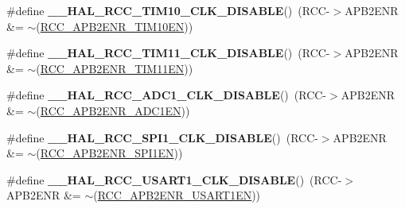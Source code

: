 \begin{DoxyCompactItemize}
\item 
\hypertarget{group___r_c_c___a_p_b2___clock___enable___disable_ga33f3e5d6b2c337d84ae550b701e37455}{\#define {\bfseries \-\_\-\-\_\-\-H\-A\-L\-\_\-\-R\-C\-C\-\_\-\-T\-I\-M10\-\_\-\-C\-L\-K\-\_\-\-D\-I\-S\-A\-B\-L\-E}()~(R\-C\-C-\/$>$A\-P\-B2\-E\-N\-R \&= $\sim$(\hyperlink{group___peripheral___registers___bits___definition_gaa98e28e157787e24b93af95273ab3055}{R\-C\-C\-\_\-\-A\-P\-B2\-E\-N\-R\-\_\-\-T\-I\-M10\-E\-N}))}\label{group___r_c_c___a_p_b2___clock___enable___disable_ga33f3e5d6b2c337d84ae550b701e37455}

\item 
\hypertarget{group___r_c_c___a_p_b2___clock___enable___disable_ga2ea675ace35a7a536c9f4cec522f28bc}{\#define {\bfseries \-\_\-\-\_\-\-H\-A\-L\-\_\-\-R\-C\-C\-\_\-\-T\-I\-M11\-\_\-\-C\-L\-K\-\_\-\-D\-I\-S\-A\-B\-L\-E}()~(R\-C\-C-\/$>$A\-P\-B2\-E\-N\-R \&= $\sim$(\hyperlink{group___peripheral___registers___bits___definition_gab1d2aeebc8ccf4e2ee18f4d924a35188}{R\-C\-C\-\_\-\-A\-P\-B2\-E\-N\-R\-\_\-\-T\-I\-M11\-E\-N}))}\label{group___r_c_c___a_p_b2___clock___enable___disable_ga2ea675ace35a7a536c9f4cec522f28bc}

\item 
\hypertarget{group___r_c_c___a_p_b2___clock___enable___disable_ga80a9e4852bac07d3d9cc6390a361302a}{\#define {\bfseries \-\_\-\-\_\-\-H\-A\-L\-\_\-\-R\-C\-C\-\_\-\-A\-D\-C1\-\_\-\-C\-L\-K\-\_\-\-D\-I\-S\-A\-B\-L\-E}()~(R\-C\-C-\/$>$A\-P\-B2\-E\-N\-R \&= $\sim$(\hyperlink{group___peripheral___registers___bits___definition_ga57b9f50cb96a2e4ceba37728b4a32a42}{R\-C\-C\-\_\-\-A\-P\-B2\-E\-N\-R\-\_\-\-A\-D\-C1\-E\-N}))}\label{group___r_c_c___a_p_b2___clock___enable___disable_ga80a9e4852bac07d3d9cc6390a361302a}

\item 
\hypertarget{group___r_c_c___a_p_b2___clock___enable___disable_gaf2ccb5c6b63a60deb6463cbc629c10fe}{\#define {\bfseries \-\_\-\-\_\-\-H\-A\-L\-\_\-\-R\-C\-C\-\_\-\-S\-P\-I1\-\_\-\-C\-L\-K\-\_\-\-D\-I\-S\-A\-B\-L\-E}()~(R\-C\-C-\/$>$A\-P\-B2\-E\-N\-R \&= $\sim$(\hyperlink{group___peripheral___registers___bits___definition_gae08a3510371b9234eb96369c91d3552f}{R\-C\-C\-\_\-\-A\-P\-B2\-E\-N\-R\-\_\-\-S\-P\-I1\-E\-N}))}\label{group___r_c_c___a_p_b2___clock___enable___disable_gaf2ccb5c6b63a60deb6463cbc629c10fe}

\item 
\hypertarget{group___r_c_c___a_p_b2___clock___enable___disable_gae0050944298552e9f02f56ec8634f5a6}{\#define {\bfseries \-\_\-\-\_\-\-H\-A\-L\-\_\-\-R\-C\-C\-\_\-\-U\-S\-A\-R\-T1\-\_\-\-C\-L\-K\-\_\-\-D\-I\-S\-A\-B\-L\-E}()~(R\-C\-C-\/$>$A\-P\-B2\-E\-N\-R \&= $\sim$(\hyperlink{group___peripheral___registers___bits___definition_ga4666bb90842e8134b32e6a34a0f165f3}{R\-C\-C\-\_\-\-A\-P\-B2\-E\-N\-R\-\_\-\-U\-S\-A\-R\-T1\-E\-N}))}\label{group___r_c_c___a_p_b2___clock___enable___disable_gae0050944298552e9f02f56ec8634f5a6}

\end{DoxyCompactItemize}


